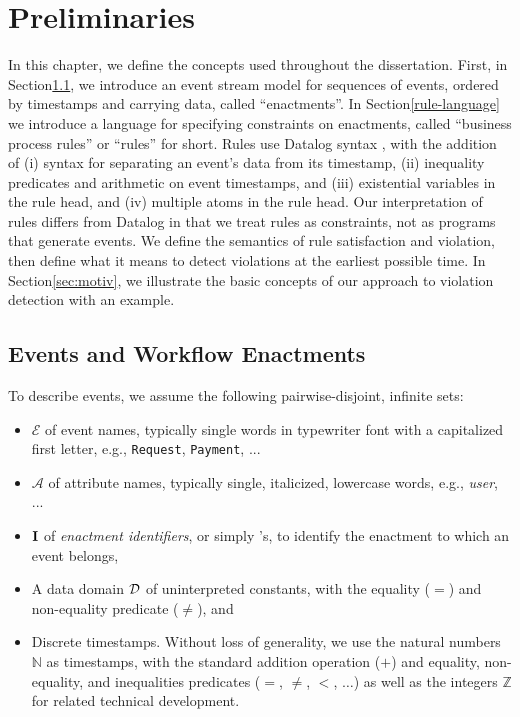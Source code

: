 \chapter{Preliminaries}
\label{chapter:preliminaries}

In this chapter, we define the concepts used throughout the dissertation.
First,
in Section\:\ref{events-enactments},
we introduce an event stream model
for sequences of events, ordered by timestamps and carrying data,
called ``enactments''.
In Section\:\ref{rule-language}
we introduce a language
for specifying constraints on enactments,
called ``business process rules''
or ``rules'' for short.
Rules use Datalog syntax \cite{ceri1989you},
with the addition of
(i) syntax for separating an event's data from its timestamp,
(ii) inequality predicates and arithmetic on event timestamps,
and
(iii) existential variables in the rule head,
and (iv) multiple atoms in the rule head.
Our interpretation of rules differs from Datalog in that
we treat rules as constraints,
not as programs that generate events.
We define the semantics of rule satisfaction and violation,
then
define what it means to detect violations at the earliest possible time.
In Section\:\ref{sec:motiv},
we illustrate the basic concepts
of our approach to violation detection
with an example.

\section{Events and Workflow Enactments}
\label{events-enactments}

To describe events,
we assume the following pairwise-disjoint, infinite sets:
\begin{itemize}
    \item $\mathcal{E}$ of event names, 
      typically single words in typewriter font with a capitalized first letter,
      e.g., {\tt Request}, {\tt Payment}, ...
    \item $\mathcal{A}$ of attribute names,
      typically single, italicized, lowercase words,
      e.g., {\it user}, ...
    \item $\textbf{I}$ of {\em enactment identifiers}, or simply {\eid}'s,
    to identify the enactment to which an event belongs,
    \item A data domain $\mathcal{D}$ of uninterpreted constants,
	    with the equality ($=$) and non-equality predicate ($\neq$), and
    \item Discrete timestamps. Without loss of generality,
      we use the natural numbers $\mathbb{N}$ as timestamps,
      with the standard addition operation ($+$)
      and equality, non-equality, and inequalities predicates ($=$, $\neq$, $<$, $\dots$) 
      as well as the integers $\mathbb{Z}$ for related technical development.
\end{itemize}

